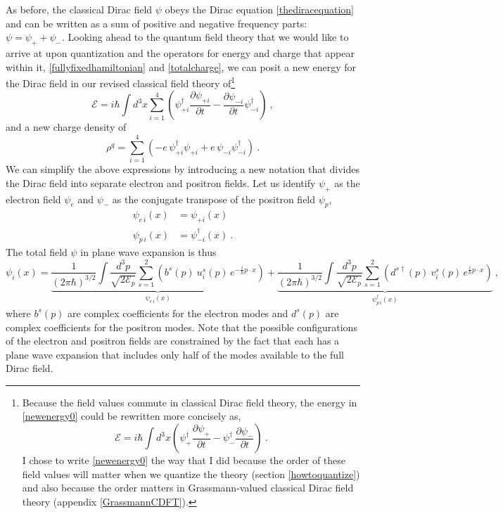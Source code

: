 \documentclass[onecolumn,secnumarabic,amsmath,amssymb,balancelastpage,nofootinbib]{article}
\begin{document}
As before, the classical Dirac field $\psi$ obeys the Dirac equation \eqref{thediracequation} and can be written as a sum of positive and negative frequency parts: $\psi=\psi_+ + \psi_-$.  Looking ahead to the quantum field theory that we would like to arrive at upon quantization and the operators for energy and charge that appear within it, \eqref{fullyfixedhamiltonian} and \eqref{totalcharge}, we can posit a new energy for the Dirac field in our revised classical field theory of\footnote{Because the field values commute in classical Dirac field theory, the energy in \eqref{newenergy0} could be rewritten more concisely as,
\begin{equation}
\mathcal{E}=i \hbar \int{d^3 x \left( \psi_+^\dagger\frac{\partial \psi_+}{\partial t} - \psi_-^\dagger\frac{\partial \psi_-}{\partial t}\right)}
\ .
\end{equation}
I chose to write \eqref{newenergy0} the way that I did because the order of these field values will matter when we quantize the theory (section \ref{howtoquantize}) and also because the order matters in Grassmann-valued classical Dirac field theory (appendix \ref{GrassmannCDFT}).} 
\begin{equation}
\mathcal{E}=i \hbar \int{d^3 x  \sum_{i=1}^4\left(\psi^{\dagger}_{+i}\frac{\partial \psi_{+i}}{\partial t}-\frac{\partial \psi_{-i}}{\partial t}\psi^{\dagger}_{-i} \right)}
\label{newenergy0}
\ ,
\end{equation}
and a new charge density of
\begin{equation}
\rho^q=\sum_{i=1}^4\left(-e\,\psi^{\dagger}_{+i} \psi_{+i}+e\,\psi_{-i}\psi^{\dagger}_{-i} \right)
\label{revisedchargedensity0}
\ .
\end{equation}
We can simplify the above expressions by introducing a new notation that divides the Dirac field into separate electron and positron fields.  Let us identify $\psi_+$ as the electron field $\psi_e$ and $\psi_-$ as the conjugate transpose of the positron field $\psi_p$,
\begin{align}
\psi_{e \, i}(x)&=\psi_{+ i}(x)
\nonumber
\\
\psi_{p \, i}(x)&=\psi^{\dagger}_{- i}(x)
\ .
\label{electronandpositronfields}
\end{align}
The total field $\psi$ in plane wave expansion is thus
\begin{equation}
\psi_i (x) =\underbrace{\frac{1}{(2\pi\hbar)^{3/2}}\int{ \frac{d^3 p}{\sqrt{2 \mathcal{E}_p}} \sum_{s=1}^2 \left(b^{s} (p) \: u_i^s (p) \, e^{-\frac{i}{\hbar} p \cdot x}\right)}}_{\mbox{$\psi_{e \, i}(x)$}}
+\underbrace{\frac{1}{(2\pi\hbar)^{3/2}}\int{ \frac{d^3 p}{\sqrt{2 \mathcal{E}_p}} \sum_{s=1}^2 \left(d^{s \dagger} (p) \: v_i^s (p) \,  e^{\frac{i}{\hbar} p \cdot x}\right)}}_{\mbox{$\psi^{\dagger}_{p \, i}(x)$}}
\ ,
\label{newplanewaveexpansion}
\end{equation}
where $b^{s} (p)$ are complex coefficients for the electron modes and $d^{s} (p)$ are complex coefficients for the positron modes.  Note that the possible configurations of the electron and positron fields are constrained by the fact that each has a plane wave expansion that includes only half of the modes available to the full Dirac field.
\end{document}
